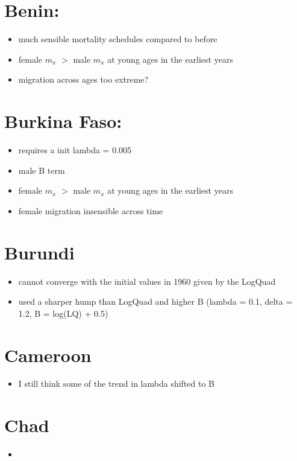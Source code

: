 \documentclass[12pt,a4paper]{article}
\begin{document}
\section*{Benin:}
\begin{itemize}
\item much sensible mortality schedules compared to before
\item female $m_x$ $>$ male $m_x$ at young ages in the earliest years
\item migration across ages too extreme?
\end{itemize}

\section*{Burkina Faso:}
\begin{itemize}
\item requires a init lambda = 0.005
\item male B term
\item female $m_x$ $>$ male $m_x$ at young ages in the earliest years
\item female migration insensible across time
\end{itemize}

\section*{Burundi}
\begin{itemize}
\item cannot converge with the initial values in 1960 given by the LogQuad
\item used a sharper hump than LogQuad and higher B (lambda = 0.1, delta = 1.2, B = log(LQ) + 0.5)
\end{itemize}

\section*{Cameroon}
\begin{itemize}
\item I still think some of the trend in lambda shifted to B
\end{itemize}

\section*{Chad}
\begin{itemize}
\item 
\end{itemize}
\end{document}

